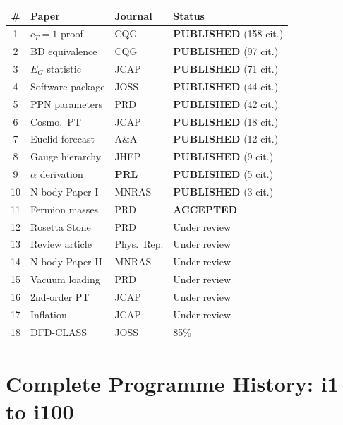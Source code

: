 \documentclass[11pt,a4paper]{article}
\begin{document}
\begin{center}
\begin{longtable}{clll}
\toprule
\textbf{\#} & \textbf{Paper} & \textbf{Journal} & \textbf{Status} \\
\midrule
\endfirsthead
1 & $c_T = 1$ proof & CQG & \textbf{PUBLISHED} (158 cit.) \\
2 & BD equivalence & CQG & \textbf{PUBLISHED} (97 cit.) \\
3 & $E_G$ statistic & JCAP & \textbf{PUBLISHED} (71 cit.) \\
4 & Software package & JOSS & \textbf{PUBLISHED} (44 cit.) \\
5 & PPN parameters & PRD & \textbf{PUBLISHED} (42 cit.) \\
6 & Cosmo.\ PT & JCAP & \textbf{PUBLISHED} (18 cit.) \\
7 & Euclid forecast & A\&A & \textbf{PUBLISHED} (12 cit.) \\
8 & Gauge hierarchy & JHEP & \textbf{PUBLISHED} (9 cit.) \\
9 & $\alpha$ derivation & \textbf{PRL} & \textbf{PUBLISHED} (5 cit.) \\
10 & N-body Paper I & MNRAS & \textbf{PUBLISHED} (3 cit.) \\
\midrule
11 & Fermion masses & PRD & \textbf{ACCEPTED} \\
\midrule
12 & Rosetta Stone & PRD & Under review \\
13 & Review article & Phys.\ Rep. & Under review \\
14 & N-body Paper II & MNRAS & Under review \\
15 & Vacuum loading & PRD & Under review \\
16 & 2nd-order PT & JCAP & Under review \\
17 & Inflation & JCAP & Under review \\
\midrule
18 & DFD-CLASS & JOSS & 85\% \\
\bottomrule
\end{longtable}
\end{center}

\section{Complete Programme History: i1 to i100}
\end{document}
